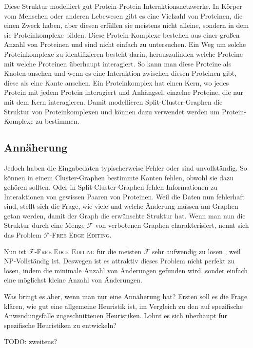 \documentclass[12pt,a4paper,onecolumn,oneside,titlepage]{article}
\newcommand\cursive[1]{\ensuremath{\mathcal{#1}}}
\begin{document}
Diese Struktur modelliert gut Protein-Protein Interaktionsnetzwerke. In Körper vom Menschen oder anderen Lebewesen gibt es eine Vielzahl von Proteinen, die einen Zweck haben, aber diesen erfüllen sie meistens nicht alleine, sondern in dem sie Proteinkomplexe bilden. Diese Protein-Komplexe bestehen aus einer großen Anzahl von Proteinen und sind nicht einfach zu untersuchen. Ein Weg um solche Proteinkomplexe zu identifizieren besteht darin, herauszufinden welche Proteine mit welche Proteinen überhaupt interagiert. So kann man diese Proteine als Knoten ansehen und wenn es eine Interaktion zwischen diesen Proteinen gibt, diese als eine Kante ansehen. 
Ein Proteinkomplex hat einen Kern, wo jedes Protein mit jedem Protein interagiert und Anhängsel, einzelne Proteine, die nur mit dem Kern interagieren. Damit modellieren Split-Cluster-Graphen die Struktur von Proteinkomplexen und können dazu verwendet werden um Protein-Komplexe zu bestimmen\cite{BrucknerHK15}.

\subsection{Annäherung}
Jedoch haben die Eingabedaten typischerweise Fehler oder sind unvollständig. So können in einem Cluster-Graphen bestimmte Kanten fehlen, obwohl sie dazu gehören sollten. Oder in Split-Cluster-Graphen fehlen Informationen zu Interaktionen von gewissen Paaren von Proteinen. Weil die Daten nun fehlerhaft sind, stellt sich die Frage, wie viele und welche Änderung müssen am Graphen getan werden, damit der Graph die erwünschte Struktur hat. Wenn man nun die Struktur durch eine Menge \cursive{F} von verbotenen Graphen charakterisiert, nennt sich das Problem \textsc{\cursive{F}-Free Edge Editing}.

Nun ist \textsc{\cursive{F}-Free Edge Editing} für die meisten \cursive{F} sehr aufwendig zu lösen \cite{Burzyn06}, weil NP-Vollständig ist. 
Deswegen ist es attraktiv dieses Problem nicht perfekt zu lösen, indem die minimale Anzahl von Änderungen gefunden wird, sonder einfach eine möglichst kleine Anzahl von Änderungen.

Was bringt es aber, wenn man nur eine Annäherung hat?  Ersten soll es die Frage klären, wie gut eine allgemeine Heuristik ist, im Vergleich zu den auf spezifische Anwendungsfälle zugeschnittenen Heuristiken. Lohnt es sich überhaupt für spezifische Heuristiken zu entwickeln? 

TODO: zweitens?


\end{document}

